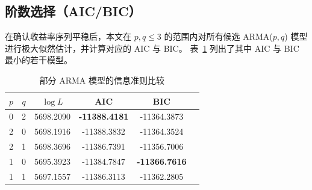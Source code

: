 \documentclass[12pt]{article}
\theoremstyle{definition}
\begin{document}

\subsection{阶数选择（AIC/BIC）}

在确认收益率序列平稳后，本文在 $p,q \le 3$ 的范围内对所有候选
ARMA($p,q$) 模型进行极大似然估计，并计算对应的 AIC 与 BIC。
表~\ref{tab:aicbic-real} 列出了其中 AIC 与 BIC 最小的若干模型。

\begin{table}[h]
    \centering
    \caption{部分 ARMA 模型的信息准则比较}
    \label{tab:aicbic-real}
    \begin{tabular}{cccccc}
        \toprule
        $p$ & $q$ & $\log L$  & AIC                  & BIC                  \\
        \midrule
        0   & 2   & 5698.2090 & \textbf{-11388.4181} & -11364.3873          \\
        2   & 0   & 5698.1916 & -11388.3832          & -11364.3524          \\
        2   & 1   & 5698.3696 & -11386.7391          & -11356.7006          \\
        1   & 0   & 5695.3923 & -11384.7847          & \textbf{-11366.7616} \\
        1   & 1   & 5697.1557 & -11386.3113          & -11362.2805          \\
        \bottomrule
    \end{tabular}
\end{table}
\end{document}
